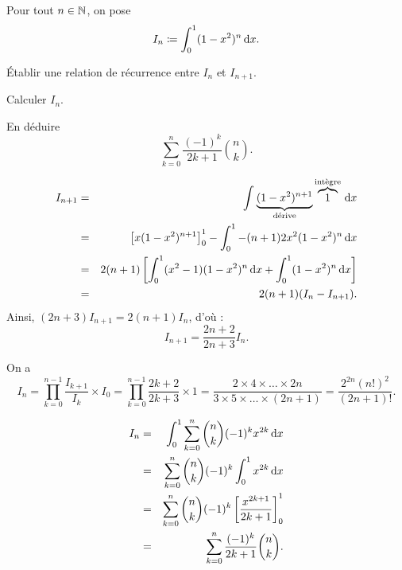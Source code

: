 \documentclass{magnolia}
\begin{document}
Pour tout $n\in\mathbb{N}$, on pose
\[I_n\coloneqq\int_{0}^{1} (1-x^2)^n\,\text{d}x.\]
\begin{questions}
\item Établir une relation de récurrence entre $I_{n}$ et $I_{n+1}$.
\item Calculer $I_{n}$.
\item En déduire \[\sum\limits_{k=0}^{n} \frac{(-1)^k}{2k+1}\binom{n}{k}.\]
\end{questions}

\begin{sol}
\begin{questions}
\item 
\begin{eqnarray*}
I_{n+1}&=&\int_{}^{} \underbrace{(1-x^2)^{n+1}}_{\text{d\'erive}} \overbrace{1}^{\text{int\`egre}}\,\text{d}x\\
&=&\left[x(1-x^2)^{n+1}\right]_0^1-\int_{0}^{1} -(n+1)2x^2(1-x^2)^n\,\text{d}x\\
&=&2(n+1)\left[\int_{0}^{1} (x^2-1)(1-x^2)^n\,\text{d}x+\int_{0}^{1} (1-x^2)^n\,\text{d}x\right]\\
&=&2(n+1)(I_n-I_{n+1}) .
\end{eqnarray*}
Ainsi, $(2n+3)I_{n+1}=2(n+1)I_n$, d'où :
$$\boxed{I_{n+1}=\frac{2n+2}{2n+3}I_n.}$$
\item On a $$\displaystyle I_n=\prod_{k=0}^{n-1}\frac{I_{k+1}}{I_k}\times I_0=\prod_{k=0}^{n-1}\frac{2k+2}{2k+3}\times 1=\frac{2\times 4\times \ldots \times 2n }{3\times 5\times \ldots \times (2n+1)}=\frac{2^{2n}(n!)^2}{(2n+1)!}.$$
\item 
\begin{eqnarray*}
I_{n}&=&\int_{0}^{1} \sum_{k=0}^n\binom{n}{k}(-1)^kx^{2k}\,\text{d}x\\
&=&\sum_{k=0}^n\binom{n}{k}(-1)^k\int_{0}^{1} x^{2k}\,\text{d}x\\
&=&\sum_{k=0}^n\binom{n}{k}(-1)^k\left[\frac{x^{2k+1}}{2k+1}\right]_0^1\\
&=&\sum_{k=0}^{n} \frac{(-1)^k}{2k+1}\binom{n}{k} .
\end{eqnarray*}
\end{questions}
\end{sol}



\end{document}
